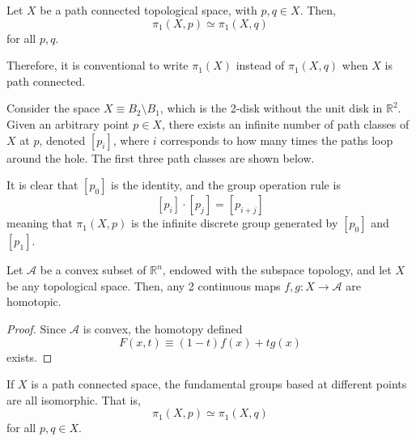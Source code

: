   \begin{lemma}
  Let $X$ be a path connected topological space, with $p, q \in X$. Then, 
  \[\pi_1 (X, p) \simeq \pi_1 (X, q)\]
  for all $p, q$. 
  \end{lemma}

  Therefore, it is conventional to write $\pi_1 (X)$ instead of $\pi_1 (X, q)$ when $X$ is path connected. 

  \begin{example}
  Consider the space $X \equiv B_2 \setminus B_1$, which is the 2-disk without the unit disk in $\mathbb{R}^2$. Given an arbitrary point $p \in X$, there exists an infinite number of path classes of $X$ at $p$, denoted $[p_i]$, where $i$ corresponds to how many times the paths loop around the hole. The first three path classes are shown below. 
  \begin{center}
  \end{center}
  It is clear that $[p_0]$ is the identity, and the group operation rule is
  \[[p_i] \cdot [p_j] = [p_{i+j}]\]
  meaning that $\pi_1(X, p)$ is the infinite discrete group generated by $[p_0]$ and $[p_1]$. 
  \end{example}

  \begin{proposition}
  Let $\mathcal{A}$ be a convex subset of $\mathbb{R}^n$, endowed with the subspace topology, and let $X$ be any topological space. Then, any 2 continuous maps $f,g: X \longrightarrow \mathcal{A}$ are homotopic. 
  \end{proposition}
  \begin{proof}
  Since $\mathcal{A}$ is convex, the homotopy defined 
  \[F(x, t) \equiv (1-t) f(x) + t g(x)\]
  exists. 
  \end{proof}

  \begin{proposition}
  If $X$ is a path connected space, the fundamental groups based at different points are all isomorphic. That is, 
  \[\pi_1 (X, p) \simeq \pi_1 (X, q)\]
  for all $p, q \in X$. 
  \end{proposition}

